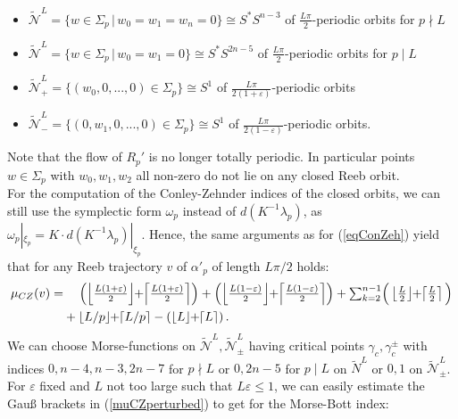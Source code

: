 \documentclass[a4paper,12pt,bibliography=totocnumbered,titlepage=false,abstracton,bookmarksnumbered=true]{scrartcl}
\newcommand{\veps}{\varepsilon}
\theoremstyle{definition}
\begin{document}
\begin{itemize}
 \item $\widetilde{\mathcal{N}}^L=\Big\{ w\in \Sigma_p\,\Big|\,w_0{=}w_1{=}w_n{=}0\Big\}\cong S^\ast S^{n-3}$ of $\frac{L\pi}{2}$-periodic orbits for $p\nmid L$
 \item $\widetilde{\mathcal{N}}^L=\Big\{ w\in \Sigma_p\,\Big|\,w_0{=}w_1{=}0\Big\}\cong S^\ast S^{2n-5}$ of $\frac{L\pi}{2}$-periodic orbits for $p\mid L$
 \item $\widetilde{\mathcal{N}}^L_+=\Big\{ (w_0,0,...,0)\in\Sigma_p\Big\}\cong S^1$ of $\frac{L\pi}{2(1+\veps)}$-periodic orbits
 \item $\widetilde{\mathcal{N}}^L_-=\Big\{(0,w_1,0,...,0)\in\Sigma_p\Big\}\cong S^1$ of $\frac{L\pi}{2(1-\veps)}$-periodic orbits.
\end{itemize}
Note that the flow of $R_p'$ is no longer totally periodic. In particular points $w\in \Sigma_p$ with $w_0, w_1, w_2$ all non-zero do not lie on any closed Reeb orbit.\\
For the computation of the Conley-Zehnder indices of the closed orbits, we can still use the symplectic form $\omega_p$ instead of $d(K^{-1}\lambda_p)$, as $\omega_p|_{\xi_p}=K{\cdot} d(K^{-1}\lambda_p)|_{\xi_p}$. Hence, the same arguments as for (\ref{eqConZeh}) yield that for any Reeb trajectory $v$ of $\alpha'_p$ of length $L\pi/2$ holds:
\begin{equation}\label{muCZperturbed}
\begin{aligned}
 \mu_{CZ}(v)=&\phantom{\,+\,}\left(\left\lfloor{\textstyle\frac{L(1+\veps)}{2}}\right\rfloor\mspace{-5mu}+\mspace{-5mu}\left\lceil{\textstyle\frac{L(1+\veps)}{2}}\right\rceil\right)+\left(\left\lfloor{\textstyle\frac{L(1-\veps)}{2}}\right\rfloor\mspace{-5mu}+\mspace{-5mu}\left\lceil{\textstyle\frac{L(1-\veps)}{2}}\right\rceil\right)+{\textstyle\sum_{k=2}^{n-1}}\Big(\left\lfloor{\textstyle\frac{L}{2}}\right\rfloor\mspace{-5mu}+\mspace{-5mu}\left\lceil{\textstyle\frac{L}{2}}\right\rceil\Big)\\
 &+\left\lfloor L/p\right\rfloor\mspace{-5mu}+\mspace{-5mu}\left\lceil L/p\right\rceil-\left(\left\lfloor L\right\rfloor\mspace{-5mu}+\mspace{-5mu}\left\lceil L\right\rceil\right).\end{aligned}
\end{equation}
We can choose Morse-functions on $\widetilde{\mathcal{N}}^L, \widetilde{\mathcal{N}}^L_\pm$ having critical points $\gamma_c, \gamma_c^\pm$ with indices $0, n{-}4, n{-}3, 2n{-}7$ for $p\nmid L$ or $0, 2n{-}5$ for $p\mid L$ on $\widetilde{N}^L$ or $0,1$ on $\widetilde{\mathcal{N}}^L_\pm$. For $\veps$ fixed and $L$ not too large such that $L\veps\leq 1$, we can easily estimate the Gau{\ss} brackets in (\ref{muCZperturbed}) to get for the Morse-Bott index:
\end{document}
